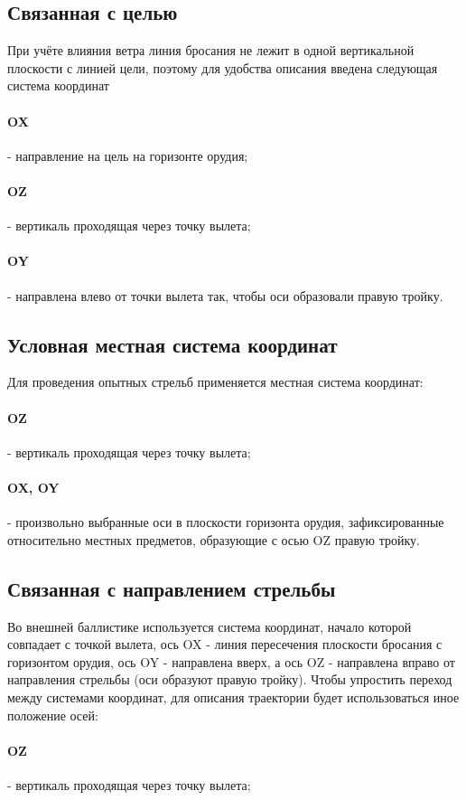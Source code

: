 \subsection{Связанная с целью}
При учёте влияния ветра линия бросания не лежит в одной вертикальной плоскости с линией цели, поэтому для удобства описания введена следующая система координат
\paragraph{OX} - направление на цель на горизонте орудия;
\paragraph{OZ} - вертикаль проходящая через точку вылета;
\paragraph{OY} - направлена влево от точки вылета так, чтобы оси образовали правую тройку.

\subsection{Условная местная система координат}
Для проведения опытных стрельб применяется местная система координат:
\paragraph{OZ} - вертикаль проходящая через точку вылета;
\paragraph{OX, OY} - произвольно выбранные оси в плоскости горизонта орудия, зафиксированные относительно местных предметов, образующие с осью OZ правую тройку.

\subsection{Связанная с направлением стрельбы}
Во внешней баллистике используется система координат, начало которой совпадает с точкой вылета, ось OX - линия пересечения плоскости бросания с горизонтом орудия, ось OY - направлена вверх, а ось OZ - направлена вправо от направления стрельбы (оси образуют правую тройку).
Чтобы упростить переход между системами координат, для описания траектории будет использоваться иное положение осей:
\paragraph{OZ} - вертикаль проходящая через точку вылета;
